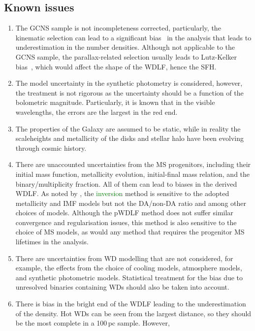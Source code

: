 \documentclass[fleqn,usenatbib]{mnras}
\begin{document}
\subsection*{Known issues}
\begin{enumerate}
    \item The GCNS sample is not incompleteness corrected, particularly, the
    kinematic selection can lead to a significant 
    bias~\citep{2015MNRAS.450.4098L} in the analysis that
    leads to underestimation in the number densities. Although not applicable to the GCNS
    sample, the parallax-related selection usually leads to Lutz-Kelker 
    bias~\citep{1973PASP...85..573L}, which would affect the shape of the
    WDLF, hence the SFH.
    \item The model uncertainty in the synthetic photometry is considered,
    however, the treatment is not rigorous as the uncertainty should be
    a function of the bolometric magnitude. Particularly, it is known that
    in the visible wavelengths, the errors are the largest in the red end.
    \item The properties of the Galaxy are assumed to be static, while in reality
    the scaleheights and metallicity of the disks and stellar halo have been
    evolving through cosmic history.
    \item There are unaccounted uncertainties from the MS progenitors,
    including their initial mass function, metallicity evolution,
    initial-final mass relation, and the binary/multiplicity fraction. All
    of them can lead to biases in the derived WDLF. As noted by
    \citet{2019ApJ...878L..11I}, the \textcolor{green}{inversion} method is sensitive to the
    adopted metallicity and IMF models but not the DA/non-DA ratio and among
    other choices of models. Although the pWDLF method does not suffer similar
    convergence and regularisation issues, this method is also sensitive to
    the choice of MS models, as would any method that requires the progenitor
    MS lifetimes in the analysis.
    \item There are uncertainties from WD modelling that are not considered,
    for example, the effects from the choice of cooling models, atmosphere
    models, and synthetic photometric models. Statistical treatment for the
    bias due to unresolved binaries containing WDs should also be taken into
    account.
    \item There is bias in the bright end of the WDLF leading to the
    underestimation of the density. Hot WDs can be seen from the largest
    distance, so they should be the most complete in a 100\,pc sample. However,

\end{enumerate}
\end{document}
